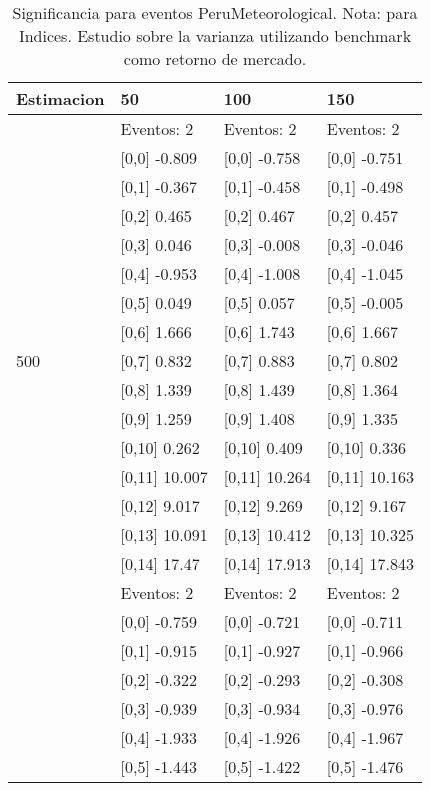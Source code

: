 \begin{table}

\caption{Significancia para eventos PeruMeteorological. Nota: para Indices. Estudio sobre la varianza utilizando benchmark como retorno de mercado.}
\centering
\begin{tabular}[t]{llll}
\toprule
Estimacion & 50 & 100 & 150\\
\midrule
 & Eventos:  2 & Eventos:  2 & Eventos:  2\\
 & {}[0,0] -0.809 & {}[0,0] -0.758 & {}[0,0] -0.751\\
 & {}[0,1] -0.367 & {}[0,1] -0.458 & {}[0,1] -0.498\\
 & {}[0,2] 0.465 & {}[0,2] 0.467 & {}[0,2] 0.457\\
 & {}[0,3] 0.046 & {}[0,3] -0.008 & {}[0,3] -0.046\\
\addlinespace
 & {}[0,4] -0.953 & {}[0,4] -1.008 & {}[0,4] -1.045\\
 & {}[0,5] 0.049 & {}[0,5] 0.057 & {}[0,5] -0.005\\
 & {}[0,6] 1.666 & {}[0,6] 1.743 & {}[0,6] 1.667\\
500 & {}[0,7] 0.832 & {}[0,7] 0.883 & {}[0,7] 0.802\\
 & {}[0,8] 1.339 & {}[0,8] 1.439 & {}[0,8] 1.364\\
\addlinespace
 & {}[0,9] 1.259 & {}[0,9] 1.408 & {}[0,9] 1.335\\
 & {}[0,10] 0.262 & {}[0,10] 0.409 & {}[0,10] 0.336\\
 & {}[0,11] 10.007 & {}[0,11] 10.264 & {}[0,11] 10.163\\
 & {}[0,12] 9.017 & {}[0,12] 9.269 & {}[0,12] 9.167\\
 & {}[0,13] 10.091 & {}[0,13] 10.412 & {}[0,13] 10.325\\
\addlinespace
 & {}[0,14] 17.47 & {}[0,14] 17.913 & {}[0,14] 17.843\\
 & Eventos:  2 & Eventos:  2 & Eventos:  2\\
 & {}[0,0] -0.759 & {}[0,0] -0.721 & {}[0,0] -0.711\\
 & {}[0,1] -0.915 & {}[0,1] -0.927 & {}[0,1] -0.966\\
 & {}[0,2] -0.322 & {}[0,2] -0.293 & {}[0,2] -0.308\\
\addlinespace
 & {}[0,3] -0.939 & {}[0,3] -0.934 & {}[0,3] -0.976\\
 & {}[0,4] -1.933 & {}[0,4] -1.926 & {}[0,4] -1.967\\
 & {}[0,5] -1.443 & {}[0,5] -1.422 & {}[0,5] -1.476\\

\end{tabular}
\end{table}
